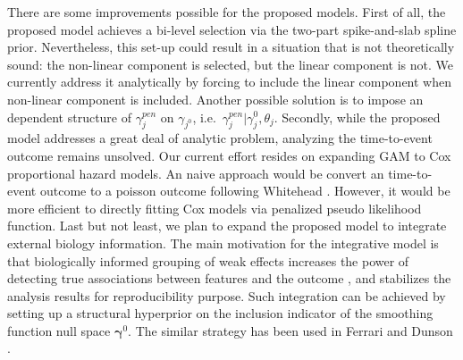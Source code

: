 \documentclass[AMA,STIX1COL,]{WileyNJD-v2}
\begin{document}
There are some improvements possible for the proposed models. First of
all, the proposed model achieves a bi-level selection via the two-part
spike-and-slab spline prior. Nevertheless, this set-up could result in a
situation that is not theoretically sound: the non-linear component is
selected, but the linear component is not. We currently address it
analytically by forcing to include the linear component when non-linear
component is included. Another possible solution is to impose an
dependent structure of \(\gamma_{j}^{pen}\) on \(\gamma_{j^{0}}\),
i.e.~\(\gamma_j^{pen}|\gamma_{j}^{0}, \theta_j\). Secondly, while the
proposed model addresses a great deal of analytic problem, analyzing the
time-to-event outcome remains unsolved. Our current effort resides on
expanding GAM to Cox proportional hazard models. An naive approach would
be convert an time-to-event outcome to a poisson outcome following
Whitehead \citep{Whitehead1980}. However, it would be more efficient to
directly fitting Cox models via penalized pseudo likelihood function.
Last but not least, we plan to expand the proposed model to integrate
external biology information. The main motivation for the integrative
model is that biologically informed grouping of weak effects increases
the power of detecting true associations between features and the
outcome \citep{Peterson2016}, and stabilizes the analysis results for
reproducibility purpose. Such integration can be achieved by setting up
a structural hyperprior on the inclusion indicator of the smoothing
function null space \(\boldsymbol{\gamma}^0\). The similar strategy has
been used in Ferrari and Dunson \citep{Ferrari2020}.


\end{document}
